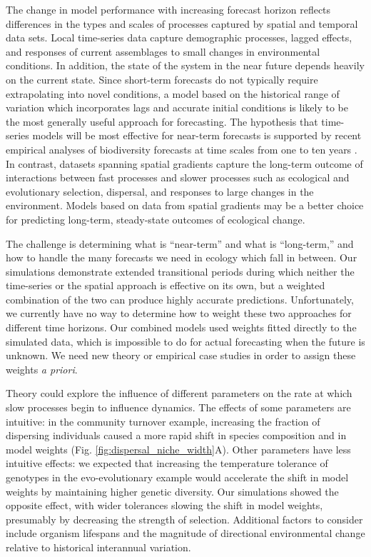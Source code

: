 \documentclass[11pt]{article}
\begin{document}
The change in model performance with increasing forecast horizon reflects differences in the types and scales of processes captured by spatial and temporal data sets. Local time-series data capture demographic processes, lagged effects, and responses of current assemblages to small changes in environmental conditions. In addition, the state of the system in the near future depends heavily on the current state. Since short-term forecasts do not typically require extrapolating into novel conditions, a model based on the historical range of variation which incorporates lags and accurate initial conditions is likely to be the most generally useful approach for forecasting. The hypothesis that time-series models will be most effective for near-term forecasts is supported by recent empirical analyses of biodiversity forecasts at time scales from one to ten years \citep{harris_forecasting_2018}. In contrast, datasets spanning spatial gradients capture the long-term outcome of interactions between fast processes and slower processes such as ecological and evolutionary selection, dispersal, and responses to large changes in the environment. Models based on data from spatial gradients may be a better choice for predicting long-term, steady-state outcomes of ecological change.

The challenge is determining what is ``near-term'' and what is ``long-term,'' and how to handle the many forecasts we need in ecology which fall in between. Our simulations demonstrate extended transitional periods during which neither the time-series or the spatial approach is effective on its own, but a weighted combination of the two can produce highly accurate predictions. Unfortunately, we currently have no way to determine how to weight these two approaches for different time horizons. Our combined models used weights fitted directly to the simulated data, which is impossible to do for actual forecasting when the future is unknown. We need new theory or empirical case studies in order to assign these weights \emph{a priori}. 

Theory could explore the influence of different parameters on the rate at which slow processes begin to influence dynamics. The effects of some parameters are intuitive: in the community turnover example, increasing the fraction of dispersing individuals caused a more rapid shift in species composition and in model weights (Fig. \ref{fig:dispersal_niche_width}A). Other parameters have less intuitive effects: we expected that increasing the temperature tolerance of genotypes in the evo-evolutionary example would accelerate the shift in model weights by maintaining higher genetic diversity. Our simulations showed the opposite effect, with wider tolerances slowing the shift in model weights, presumably by decreasing the strength of selection. Additional factors to consider include organism lifespans and the magnitude of directional environmental change relative to historical interannual variation. 
\end{document}
